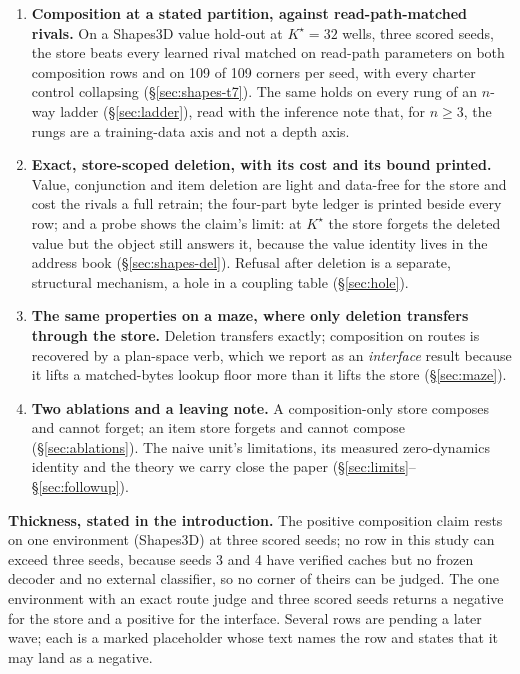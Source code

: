 \documentclass{article}
\newcommand{\Kstar}{\ensuremath{K^{\star}}}
\begin{document}
\begin{enumerate}[leftmargin=*,itemsep=2pt]
\item \textbf{Composition at a stated partition, against read-path-matched rivals.} On a
  Shapes3D value hold-out at $\Kstar=32$ wells, three scored seeds, the store beats every
  learned rival matched on read-path parameters on both composition rows and on 109 of 109
  corners per seed, with every charter control collapsing
  (\S\ref{sec:shapes-t7}). The same holds on every rung of an $n$-way ladder
  (\S\ref{sec:ladder}), read with the inference note that, for $n\ge3$, the rungs are a
  training-data axis and not a depth axis.
\item \textbf{Exact, store-scoped deletion, with its cost and its bound printed.} Value,
  conjunction and item deletion are light and data-free for the store and cost the rivals a
  full retrain; the four-part byte ledger is printed beside every row; and a probe shows the
  claim's limit: at $\Kstar$ the store forgets the deleted value but the object still answers
  it, because the value identity lives in the address book (\S\ref{sec:shapes-del}).
  Refusal after deletion is a separate, structural mechanism, a hole in a coupling table
  (\S\ref{sec:hole}).
\item \textbf{The same properties on a maze, where only deletion transfers through the
  store.} Deletion transfers exactly; composition on routes is recovered by a plan-space
  verb, which we report as an \emph{interface} result because it lifts a matched-bytes lookup
  floor more than it lifts the store (\S\ref{sec:maze}).
\item \textbf{Two ablations and a leaving note.} A composition-only store composes and cannot
  forget; an item store forgets and cannot compose (\S\ref{sec:ablations}). The naive unit's
  limitations, its measured zero-dynamics identity and the theory we carry close the paper
  (\S\ref{sec:limits}--\S\ref{sec:followup}).
\end{enumerate}

\noindent\textbf{Thickness, stated in the introduction.} The positive composition claim rests
on one environment (Shapes3D) at three scored seeds; no row in this study can exceed three
seeds, because seeds 3 and 4 have verified caches but no frozen decoder and no external
classifier, so no corner of theirs can be judged.
The one environment with an exact route judge and three scored seeds returns a negative for
the store and a positive for the interface. Several rows are pending a later wave; each is a
marked placeholder whose text names the row and states that it may land as a negative.
\end{document}
